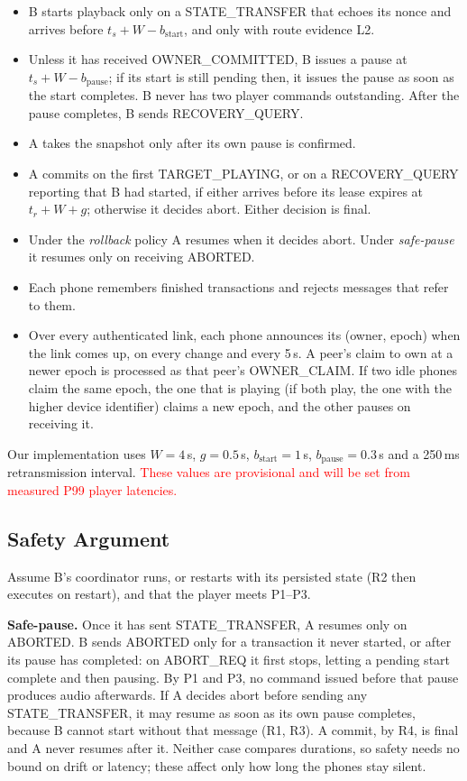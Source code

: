 \documentclass[conference]{IEEEtran}
\newcommand{\draftnote}[1]{\textcolor{red}{#1}}
\begin{document}
\begin{itemize}
\item[R1] B starts playback only on a STATE\_TRANSFER that echoes its nonce and arrives before $t_s + W - b_{\mathrm{start}}$, and only with route evidence L2.
\item[R2] Unless it has received OWNER\_COMMITTED, B issues a pause at $t_s + W - b_{\mathrm{pause}}$; if its start is still pending then, it issues the pause as soon as the start completes. B never has two player commands outstanding. After the pause completes, B sends RECOVERY\_QUERY.
\item[R3] A takes the snapshot only after its own pause is confirmed.
\item[R4] A commits on the first TARGET\_PLAYING, or on a RECOVERY\_QUERY reporting that B had started, if either arrives before its lease expires at $t_r + W + g$; otherwise it decides abort. Either decision is final.
\item[R5] Under the \emph{rollback} policy A resumes when it decides abort. Under \emph{safe-pause} it resumes only on receiving ABORTED.
\item[R6] Each phone remembers finished transactions and rejects messages that refer to them.
\item[R7] Over every authenticated link, each phone announces its (owner, epoch) when the link comes up, on every change and every 5\,s. A peer's claim to own at a newer epoch is processed as that peer's OWNER\_CLAIM. If two idle phones claim the same epoch, the one that is playing (if both play, the one with the higher device identifier) claims a new epoch, and the other pauses on receiving it.
\end{itemize}

Our implementation uses $W=4$\,s, $g=0.5$\,s, $b_{\mathrm{start}}=1$\,s, $b_{\mathrm{pause}}=0.3$\,s and a 250\,ms retransmission interval. \draftnote{These values are provisional and will be set from measured P99 player latencies.}

\subsection{Safety Argument}

Assume B's coordinator runs, or restarts with its persisted state (R2 then executes on restart), and that the player meets P1--P3.

\textbf{Safe-pause.} Once it has sent STATE\_TRANSFER, A resumes only on ABORTED. B sends ABORTED only for a transaction it never started, or after its pause has completed: on ABORT\_REQ it first stops, letting a pending start complete and then pausing. By P1 and P3, no command issued before that pause produces audio afterwards. If A decides abort before sending any STATE\_TRANSFER, it may resume as soon as its own pause completes, because B cannot start without that message (R1, R3). A commit, by R4, is final and A never resumes after it. Neither case compares durations, so safety needs no bound on drift or latency; these affect only how long the phones stay silent.
\end{document}
